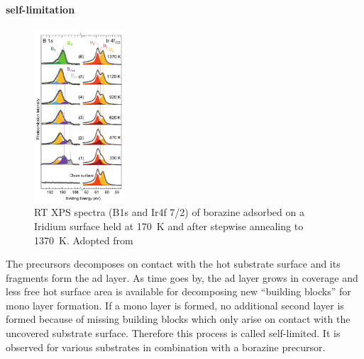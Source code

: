 \paragraph{self-limitation}
\begin{figure}\centering
	\includegraphics[width=0.3\textwidth]{./images/07571n_fig5.png}
	\caption{RT XPS spectra (B1s and Ir4f 7/2) of borazine adsorbed on a Iridium surface held at \SI{170}{\kelvin} and after stepwise annealing to \SI{1370}{\kelvin}. Adopted from \cite{orlando_epitaxial_2012}}
	\label{fig:borazine-TPG-on-Ir}
\end{figure}

The precursors decomposes on contact with the hot substrate surface and its fragments form the ad layer. As time goes by, the ad layer grows in coverage and less free hot surface area is available for decomposing new ``building blocks'' for mono layer formation. If a mono layer is formed, no additional second layer is formed because of missing building blocks which only arise on contact with the uncovered substrate surface. Therefore this process is called self-limited. It is observed \cite{corso_h-bn_2005, cavar_single_2008, muller_epitaxial_2010} for various substrates in combination with a borazine precursor.

%

